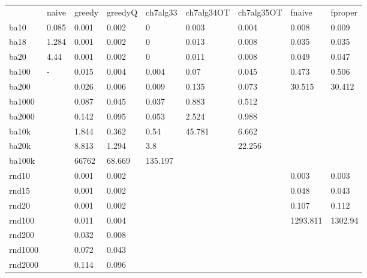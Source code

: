 \begin{landscape}
	\begin{table}[h]
		\centering
		\begin{tabular}{lllllllll}
			& naive & greedy & greedyQ & ch7alg33 & ch7alg34OT & ch7alg35OT & fnaive   & fproper \\
			ba10    & 0.085 & 0.001  & 0.002   & 0        & 0.003      & 0.004      & 0.008    & 0.009 \\
			ba18    & 1.284 & 0.001  & 0.002   & 0        & 0.013      & 0.008      & 0.035    & 0.035 \\
			ba20    & 4.44  & 0.001  & 0.002   & 0        & 0.011      & 0.008      & 0.049    & 0.047 \\
			ba100   & -     & 0.015  & 0.004   & 0.004    & 0.07       & 0.045      & 0.473    & 0.506 \\
			ba200   &       & 0.026  & 0.006   & 0.009    & 0.135      & 0.073      & 30.515   & 30.412 \\
			ba1000  &       & 0.087  & 0.045   & 0.037    & 0.883      & 0.512      &          & \\
			ba2000  &       & 0.142  & 0.095   & 0.053    & 2.524      & 0.988      &          & \\
			ba10k   &       & 1.844  & 0.362   & 0.54     & 45.781     & 6.662      &          & \\
			ba20k   &       & 8.813  & 1.294   & 3.8      &            & 22.256     &          & \\
			ba100k  &       & 66762  & 68.669  & 135.197  &            &            &          & \\
			rnd10   &       & 0.001  & 0.002   &          &            &            & 0.003    & 0.003 \\
			rnd15   &       & 0.001  & 0.002   &          &            &            & 0.048    & 0.043 \\
			rnd20   &       & 0.001  & 0.002   &          &            &            & 0.107    & 0.112 \\
			rnd100  &       & 0.011  & 0.004   &          &            &            & 1293.811 & 1302.94 \\
			rnd200  &       & 0.032  & 0.008   &          &            &            &          & \\
			rnd1000 &       & 0.072  & 0.043   &          &            &            &          & \\
			rnd2000 &       & 0.114  & 0.096   &          &            &            &          & \\

\end{tabular}
\end{table}
\end{landscape}

